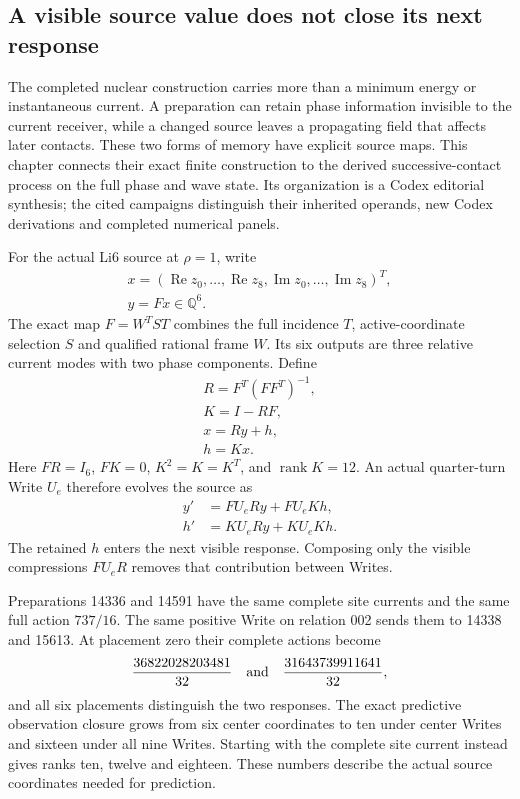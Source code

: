 \label{ch:nuclear-process}

\subsection{A visible source value does not close its next response}

The completed nuclear construction carries more than a minimum energy or
instantaneous current. A preparation can retain phase information invisible
to the current receiver, while a changed source leaves a propagating field
that affects later contacts. These two forms of memory have explicit source
maps. This chapter connects their exact finite construction to the derived
successive-contact process on the full phase and wave state. Its organization
is a Codex editorial synthesis; the cited campaigns distinguish their
inherited operands, new Codex derivations and completed numerical panels.

For the actual Li6 source at \(\rho=1\), write
\[
\begin{gathered}
x=(\operatorname{Re}z_0,\ldots,\operatorname{Re}z_8,
       \operatorname{Im}z_0,\ldots,\operatorname{Im}z_8)^T,\\
 y=Fx\in\mathbb Q^6.
\end{gathered}
\]
The exact map \(F=W^TST\) combines the full incidence \(T\), active-coordinate
selection \(S\) and qualified rational frame \(W\). Its six outputs are three
relative current modes with two phase components. Define
\[
\begin{gathered}
R=F^T(FF^T)^{-1},\\
 K=I-RF,\\
 x=Ry+h,\\
 h=Kx.
\end{gathered}
\]
Here \(FR=I_6\), \(FK=0\), \(K^2=K=K^T\), and \(\operatorname{rank}K=12\).
An actual quarter-turn Write \(U_e\) therefore evolves the source as
\[
 \begin{split}
 y'&=FU_eRy+FU_eKh,\\
 h'&=KU_eRy+KU_eKh.
 \end{split}
\]
The retained \(h\) enters the next visible response. Composing only the
visible compressions \(FU_eR\) removes that contribution between Writes.

Preparations 14336 and 14591 have the same complete site currents and the
same full action \(737/16\). The same positive Write on relation 002 sends
them to 14338 and 15613. At placement zero their complete actions become
\[
 \frac{36822028203481}{32}
 \quad\hbox{and}\quad
 \frac{31643739911641}{32},
\]
and all six placements distinguish the two responses. The exact predictive
observation closure grows from six center coordinates to ten under center
Writes and sixteen under all nine Writes. Starting with the complete site
current instead gives ranks ten, twelve and eighteen. These numbers
describe the actual source coordinates needed for prediction.

